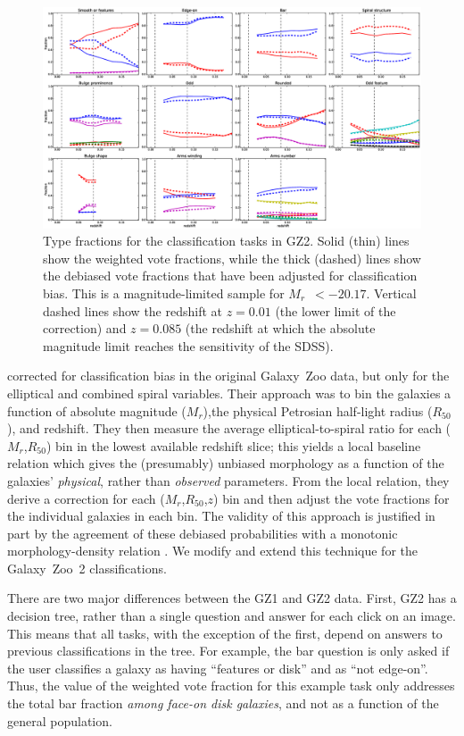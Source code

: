 \documentclass[useAMS,usenatbib]{mn2e}
\newcommand{\mr}{$M_r$}
\newcommand{\rfifty}{$R_{50}$}
\begin{document}
\begin{figure}
\includegraphics[angle=0,width=7.0in]{figures/gz2_type_fractions.eps}
\caption{Type fractions for the classification tasks in GZ2. Solid (thin) lines show the weighted vote fractions, while the thick (dashed) lines show the debiased vote fractions that have been adjusted for classification bias. This is a magnitude-limited sample for \mr~$<-20.17$. Vertical dashed lines show the redshift at $z=0.01$ (the lower limit of the correction) and $z=0.085$ (the redshift at which the absolute magnitude limit reaches the sensitivity of the SDSS). 
\label{fig-type_fractions}}
\end{figure}

\citet{bam09} corrected for classification bias in the original Galaxy~Zoo data, but only for the elliptical and combined spiral variables. Their approach was to bin the galaxies a function of absolute magnitude (\mr),the physical Petrosian half-light radius (\rfifty), and redshift. They then measure the average elliptical-to-spiral ratio for each (\mr,\rfifty) bin in the lowest available redshift slice; this yields a local baseline relation which gives the (presumably) unbiased morphology as a function of the galaxies' {\em physical}, rather than {\em observed} parameters. From the local relation, they derive a correction for each (\mr,\rfifty,$z$) bin and then adjust the vote fractions for the individual galaxies in each bin. The validity of this approach is justified in part by the agreement of these debiased probabilities with a monotonic morphology-density relation \citep{bam09}. We modify and extend this technique for the Galaxy~Zoo~2 classifications. 

There are two major differences between the GZ1 and GZ2 data. First, GZ2 has a decision tree, rather than a single question and answer for each click on an image. This means that all tasks, with the exception of the first, depend on answers to previous classifications in the tree. For example, the bar question is only asked if the user classifies a galaxy as having ``features or disk'' and as ``not edge-on''. Thus, the value of the weighted vote fraction for this example task only addresses the total bar fraction {\em among face-on disk galaxies}, and not as a function of the general population. 
\end{document}
